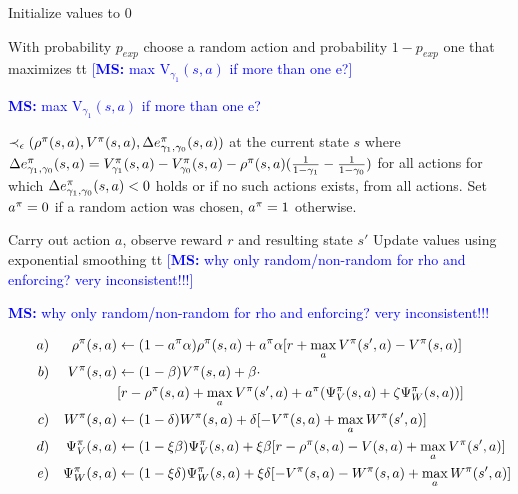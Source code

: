 \documentclass[envcountsame]{llncs}
\newcommand\MS[2][r]{\ifx t#1 \textcolor{blue}{[\textbf{MS:} #2]}
  \else \begin{center}\textcolor{blue}{\textbf{MS:} #2} \end{center} \fi}
\begin{document}
\begin{algorithm}[t!]
  \begin{algorithmic}[1]
    \State{}Initialize values to \(0\) 
    \State{}\begin{minipage}[t]{0.9\textwidth} With probability \(p_{exp}\) choose a random action
      and probability \(1-p_{exp}\) one that maximizes \MS[t]{max V$_{\gamma_{1}}(s,a)$ if more than
      one e?}
      \(\prec_{\epsilon}(\rho^{\pi}(s,a),V^{\pi}(s,a),\Delta e^\pi_{\gamma_{1},\gamma_{0}}(s,a))\) at the
      current state \(s\) where
      \(\Delta e_{\gamma_{1},\gamma_{0}}^{\pi}(s,a) = V_{\gamma_{1}}^{\pi}(s,a) -
      V_{\gamma_{0}}^{\pi}(s,a) - \rho^{\pi}(s,a) (\frac{1}{1-\gamma_{1}} -
      \frac{1}{1-\gamma_{0}})\)
      for all actions for which
      \(\Delta e_{\gamma_{1},\gamma_{0}}^{\pi}(s,a) < 0\) holds or if no such actions exists, from
      all actions. Set \(a^{\pi} = 0\) if a random action was chosen,
      \(a^{\pi}=1\) otherwise.
    \end{minipage}
    \State{}Carry out action \(a\), observe reward \(r\) and resulting state \(s'\)
    \State{}Update values using exponential smoothing
      \MS[t]{why only random/non-random for rho and enforcing? very inconsistent!!!}
    \begin{align*}
      \qquad a) & & \avgrew^{\pol}(s,a)  & \gets (1- a^{\pol} \alpha) \avgrew^{\pol}(s,a) + a^{\pol} \alpha [r + \max_{a}\V^{\pol}(s',a) - \V^{\pol}(s,a)]     \\
      b) & & \V^{\pol}(s,a)        & \gets (1-\beta) \V^{\pol}(s,a) + \beta  \cdot \\
         &        &                      & [r - \avgrew^{\pol}(s,a) + \max_{a} \V^{\pol}(s',a) +
                                           a^{\pol} (\Psi_{V}^{\pol}(s,a) + \zeta \Psi_{W}^{\pol}(s,a))] \\
      c) & & W^{\pol}(s,a)        & \gets (1-\delta) W^{\pol}(s,a) + \delta [-\V^{\pol}(s,a) +
                                    \max_{a} W^{\pol}(s',a)]              \\
      d) & & \Psi_{V}^{\pol}(s,a) & \gets (1-\xi \beta) \Psi_{V}^{\pol}(s,a) + \xi \beta [r - \avgrew^{\pol}(s,a) - V(s,a) + \max_{a}V^{\pol}(s',a)]\\
      e) & & \Psi_{W}^{\pol}(s,a) & \gets (1-\xi \delta) \Psi_{W}^{\pol}(s,a) + \xi \delta [- V^{\pol}(s,a) - W^{\pol}(s,a) + \max_{a} W^{\pol}(s',a)]

\end{align*}
\end{algorithmic}
\end{algorithm}
\end{document}
